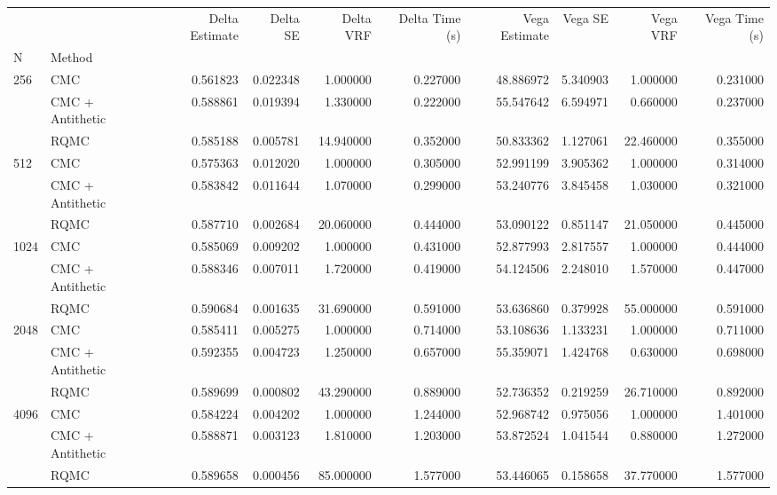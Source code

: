 \begin{tabular}{llrrrrrrrr}
\toprule
 &  & Delta Estimate & Delta SE & Delta VRF & Delta Time (s) & Vega Estimate & Vega SE & Vega VRF & Vega Time (s) \\
N & Method &  &  &  &  &  &  &  &  \\
\midrule
\multirow[t]{3}{*}{256} & CMC & 0.561823 & 0.022348 & 1.000000 & 0.227000 & 48.886972 & 5.340903 & 1.000000 & 0.231000 \\
 & CMC + Antithetic & 0.588861 & 0.019394 & 1.330000 & 0.222000 & 55.547642 & 6.594971 & 0.660000 & 0.237000 \\
 & RQMC & 0.585188 & 0.005781 & 14.940000 & 0.352000 & 50.833362 & 1.127061 & 22.460000 & 0.355000 \\
\cline{1-10}
\multirow[t]{3}{*}{512} & CMC & 0.575363 & 0.012020 & 1.000000 & 0.305000 & 52.991199 & 3.905362 & 1.000000 & 0.314000 \\
 & CMC + Antithetic & 0.583842 & 0.011644 & 1.070000 & 0.299000 & 53.240776 & 3.845458 & 1.030000 & 0.321000 \\
 & RQMC & 0.587710 & 0.002684 & 20.060000 & 0.444000 & 53.090122 & 0.851147 & 21.050000 & 0.445000 \\
\cline{1-10}
\multirow[t]{3}{*}{1024} & CMC & 0.585069 & 0.009202 & 1.000000 & 0.431000 & 52.877993 & 2.817557 & 1.000000 & 0.444000 \\
 & CMC + Antithetic & 0.588346 & 0.007011 & 1.720000 & 0.419000 & 54.124506 & 2.248010 & 1.570000 & 0.447000 \\
 & RQMC & 0.590684 & 0.001635 & 31.690000 & 0.591000 & 53.636860 & 0.379928 & 55.000000 & 0.591000 \\
\cline{1-10}
\multirow[t]{3}{*}{2048} & CMC & 0.585411 & 0.005275 & 1.000000 & 0.714000 & 53.108636 & 1.133231 & 1.000000 & 0.711000 \\
 & CMC + Antithetic & 0.592355 & 0.004723 & 1.250000 & 0.657000 & 55.359071 & 1.424768 & 0.630000 & 0.698000 \\
 & RQMC & 0.589699 & 0.000802 & 43.290000 & 0.889000 & 52.736352 & 0.219259 & 26.710000 & 0.892000 \\
\cline{1-10}
\multirow[t]{3}{*}{4096} & CMC & 0.584224 & 0.004202 & 1.000000 & 1.244000 & 52.968742 & 0.975056 & 1.000000 & 1.401000 \\
 & CMC + Antithetic & 0.588871 & 0.003123 & 1.810000 & 1.203000 & 53.872524 & 1.041544 & 0.880000 & 1.272000 \\
 & RQMC & 0.589658 & 0.000456 & 85.000000 & 1.577000 & 53.446065 & 0.158658 & 37.770000 & 1.577000 \\

\end{tabular}
